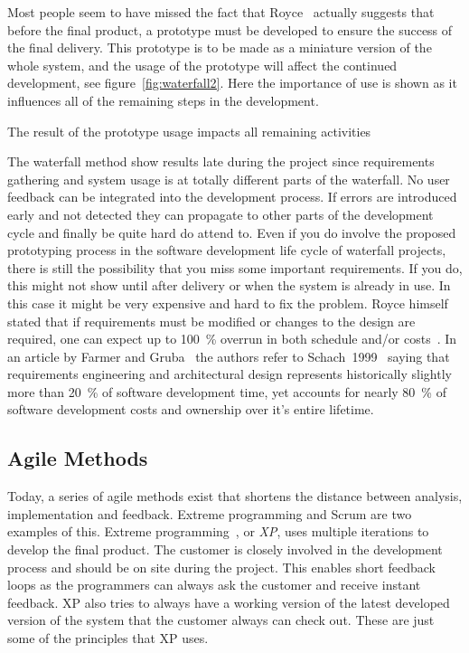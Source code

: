 \documentclass[a4paper]{report}
\begin{document}
Most people seem to have missed the fact that Royce~\cite{Royce:1987} actually suggests that before the final product, a prototype must be developed to ensure the success of the final delivery. This prototype is to be made as a miniature version of the whole system, and the usage of the prototype will affect the continued development, see figure~\ref{fig:waterfall2}. Here the importance of use is shown as it influences all of the remaining steps in the development.

	{The result of the prototype usage impacts all remaining activities~\cite{Royce:1987}}

The waterfall method show results late during the project since requirements gathering and system usage is at totally different parts of the waterfall. No user feedback can be integrated into the development process. If errors are introduced early and not detected they can propagate to other parts of the development cycle and finally be quite hard do attend to. Even if you do involve the proposed prototyping process in the software development life cycle of waterfall projects, there is still the possibility that you miss some important requirements. If you do, this might not show until after delivery or when the system is already in use. In this case it might be very expensive and hard to fix the problem. Royce himself stated that if requirements must be modified or changes to the design are required, one can expect up to 100~\% overrun in both schedule and/or costs~\cite{Royce:1987}. In an article by Farmer and Gruba~\cite{Farmer-Gruba:2006} the authors refer to Schach~1999~\cite{Schach:1999} saying that requirements engineering and architectural design represents historically slightly more than 20~\% of software development time, yet accounts for nearly 80~\% of software development costs and ownership over it's entire lifetime.

\subsection{Agile Methods}
Today, a series of agile methods exist that shortens the distance between analysis, implementation and feedback. Extreme programming and Scrum are two examples of this. Extreme programming~\cite{Beck:1999}, or \emph{XP}, uses multiple iterations to develop the final product. The customer is closely involved in the development process and should be on site during the project. This enables short feedback loops as the programmers can always ask the customer and receive instant feedback. XP also tries to always have a working version of the latest developed version of the system that the customer always can check out. These are just some of the principles that XP uses.
\end{document}
